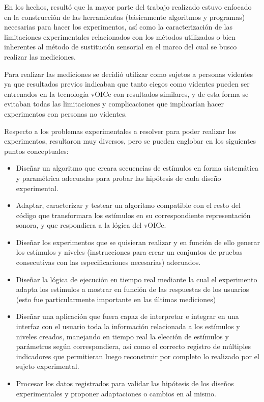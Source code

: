 \documentclass{article}
\numberwithin{figure}{section}
\begin{document}
    En los hechos, resultó que la mayor parte del trabajo realizado estuvo enfocado en la construcción de las herramientas (básicamente algoritmos y programas) necesarias para hacer los experimentos, así como la caracterización de las limitaciones experimentales relacionados con los métodos utilizados o bien inherentes al método de sustitución sensorial en el marco del cual se busco realizar las mediciones. 
    
    Para realizar las mediciones se decidió utilizar como sujetos a personas videntes ya que resultados previos\cite{VoiceEntrenamiento3} indicaban que tanto ciegos como videntes pueden ser entrenados en la tecnología vOICe con resultados similares, y de esta forma se evitaban todas las limitaciones y complicaciones que implicarían hacer experimentos con personas no videntes.
    
    Respecto a los problemas experimentales a resolver para poder realizar los experimentos, resultaron muy diversos, pero se pueden englobar en los siguientes puntos conceptuales: 
    
    \begin{itemize}
        \item Diseñar un algoritmo que creara secuencias de estímulos en forma sistemática y paramétrica adecuadas para probar las hipótesis de cada diseño experimental. 
        \item Adaptar, caracterizar y testear un algoritmo compatible con el resto del código que transformara los estímulos en su correspondiente representación sonora, y que respondiera a la lógica del vOICe. 
        \item Diseñar los experimentos que se quisieran realizar y en función de ello generar los estímulos y niveles (instrucciones para crear un conjuntos de pruebas consecutivas con las especificaciones necesarias) adecuados.
        \item Diseñar la lógica de ejecución en tiempo real mediante la cual el experimento adapta los estímulos a mostrar en función de las respuestas de los usuarios (esto fue particularmente importante en las últimas mediciones)
        \item Diseñar una aplicación que fuera capaz de interpretar e integrar en una interfaz con el usuario toda la información relacionada a los estímulos y niveles creados, manejando en tiempo real la elección de estímulos y parámetros según correspondiera, así como el correcto registro de múltiples indicadores que permitieran luego reconstruir por completo lo realizado por el sujeto experimental. 
        \item Procesar los datos registrados para validar las hipótesis de los diseños experimentales y proponer adaptaciones o cambios en al mismo. 
    \end{itemize}
    
\end{document}
